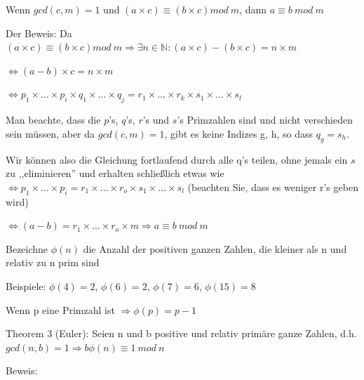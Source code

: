 \documentclass[a4paper]{article}
\begin{document}
\begin{multicols}{3}
\begin{itemize*}
\begin{itemize*}
                  \begin{itemize*}
                        \item Wenn $gcd(c,m)=1$ und $(a\times c)\equiv(b\times c)mod\ m$, dann $a\equiv b\ mod\ m$
                        \item Der Beweis: Da $(a\times c)\equiv(b\times c)mod\ m\Rightarrow\exists n\in\mathbb{N}:(a\times c)-(b\times c)=n\times m$
                        \item $\Leftrightarrow ( a - b ) \times c = n \times m$
                        \item $\Leftrightarrow p_1\times ...\times p_i\times q_1\times ...\times q_j=r_1\times ...\times r_k\times s_1\times ...\times s_l$
                        \item Man beachte, dass die $p$'s, $q$'s, $r$'s und $s$'s Primzahlen sind und nicht verschieden sein müssen, aber da $gcd(c,m)=1$, gibt es keine Indizes g, h, so dass $q_g = s_h$.
                        \item Wir können also die Gleichung fortlaufend durch alle q's teilen, ohne jemals ein $s$ zu ,,eliminieren'' und erhalten schließlich etwas wie $\Leftrightarrow p_1\times ...\times p_i=r_1\times ...\times r_o\times s_1\times ...\times s_l$ (beachten Sie, dass es weniger r's geben wird)
                        \item $\Leftrightarrow(a-b)=r_1\times ...\times r_o\times m\Rightarrow a \equiv b\ mod\ m$
                  \end{itemize*}
                  \item Bezeichne $\phi(n)$ die Anzahl der positiven ganzen Zahlen, die kleiner als n und relativ zu n prim sind
                  \begin{itemize*}
                        \item Beispiele: $\phi(4) = 2$, $\phi(6)=2$, $\phi(7)=6$, $\phi(15)=8$
                        \item Wenn p eine Primzahl ist $\Rightarrow\phi(p)=p-1$
                  \end{itemize*}
            \end{itemize*}
            \item Theorem 3 (Euler): Seien n und b positive und relativ primäre ganze
            Zahlen, d.h. $gcd(n, b) = 1 \Rightarrow b \phi(n) \equiv 1\ mod\ n$
            \begin{itemize*}
                  \item Beweis:
                  \begin{itemize*}

\end{itemize*}
\end{itemize*}
\end{itemize*}
\end{multicols}
\end{document}
